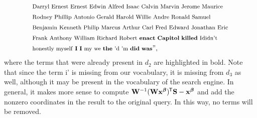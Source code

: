 \documentclass[
  digital, %
  notable, %
  lof,     %
  lot,     %
  nopalatino, color
]{fithesis3}
\newcommand*{\tran}{^{\mkern-1.5mu\mathsf{T}}}
\begin{document}
\begin{align*}
  &\text{\footnotesize Darryl Ernest Ernest Edwin Alfred Isaac Calvin Marvin Jerome Maurice} \\
  &\text{\footnotesize Rodney Phillip Antonio Gerald Harold Willie Andre Ronald Samuel} \\
  &\text{\footnotesize Benjamin Kenneth Philip Marcus Arthur Carl Fred Edward Jonathan Eric} \\
  &\text{\footnotesize Frank Anthony William Richard Robert \textbf{enact} \textbf{Capitol} \textbf{killed} Ididn't} \\
  &\text{\begingroup\footnotesize honestly myself \textbf{I} \textbf{I} my we \textbf{the}
    'd 'm \textbf{did} \textbf{was}\endgroup''},
\end{align*}
\endgroup
where the terms that were already present in $d_2$ are highlighted
in bold. Note that since the term i' is missing from our vocabulary, it is
missing from $d_3$ as well, although it may be present in the vocabulary of the
search engine. In general, it makes more sense to compute $\mathbf
W^{-1}(\mathbf W\mathbf x^{\bm\beta})\tran\mathbf S - \mathbf x^{\bm\beta}$ and
add the nonzero coordinates in the result to the original query. In this way,
no terms will be removed.
\end{document}
